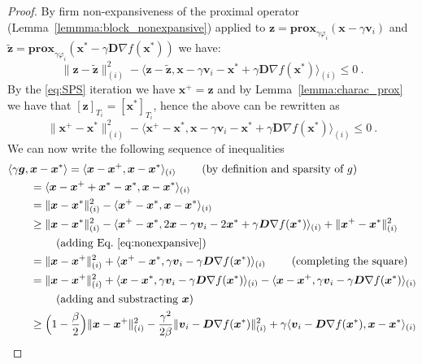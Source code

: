 \documentclass{article}
\def\prox{{\mathbf{prox}}}
\def\xx{{\boldsymbol x}}
\def\vv{{\boldsymbol v}}
\def\zz{{\boldsymbol z}}
\def\DD{{\boldsymbol D}}
\renewcommand{\llbracket}{[}
\renewcommand{\rrbracket}{]}
\begin{document}
\begin{proof}
By firm non-expansiveness of the proximal operator (Lemma~\ref{lemmma:block_nonexpansive}) applied to $\zz = \prox_{\gamma \varphi_i}(\xx - \gamma \vv_i)$ and $\tilde{\zz} = \prox_{\gamma \varphi_i}(\xx^* - \gamma \DD  \nabla f(\xx^*))$ we have:
\begin{equation}
  \|\zz - \tilde\zz\|_{(i)}^2 - \langle \zz - \tilde\zz, \xx - \gamma \vv_i - \xx^* + \gamma \DD \nabla f(\xx^*) \rangle_{(i)} \leq 0~.
\end{equation}
By the \eqref{eq:SPS} iteration we have $\xx^+ = \zz$ and by Lemma~\ref{lemma:charac_prox} we have that $\llbracket\zz\rrbracket_{T_i} = \llbracket\xx^*\rrbracket_{T_i}$, hence the above can be rewritten as
  \begin{equation}\label{eq:nonexpansive}
    \|\xx^+ - \xx^*\|_{(i)}^2 - \langle \xx^+ - \xx^*, \xx - \gamma \vv_i - \xx^* + \gamma \DD \nabla f(\xx^*) \rangle_{(i)} \leq 0~.
  \end{equation}
  We can now write the following sequence of inequalities
\begin{align}
    &\langle \gamma \boldsymbol g, \xx - \xx^*\rangle = \langle \xx - \xx^+, \xx - \xx^* \rangle_{(i)} \qquad \text{ (by definition and sparsity of $g$)}\nonumber\\
    &\qquad=  \langle \xx - \xx^+ + \xx^* - \xx^*, \xx - \xx^* \rangle_{(i)} \nonumber\\
    &\qquad= \|\xx - \xx^*\|_{(i)}^2 -  \langle \xx^+ - \xx^*, \xx - \xx^* \rangle_{(i)} \nonumber\\
    &\qquad\geq \|\xx - \xx^*\|_{(i)}^2 - \langle \xx^+ - \xx^*, 2 \xx - \gamma \vv_i- 2 \xx^* + \gamma \DD \nabla f(\xx^*) \rangle_{(i)} + \|\xx^+ - \xx^*\|^2_{(i)} \\
    &\qquad\qquad \text{ (adding Eq.~\eqref{eq:nonexpansive})} \nonumber\\
    &\qquad= \|\xx - \xx^+\|_{(i)}^2 + \langle \xx^+ - \xx^*, \gamma \vv_i -  \gamma \DD \nabla f(\xx^*) \rangle_{(i)} \qquad \text{ (completing the square)} \nonumber\\
    &\qquad= \|\xx - \xx^+\|_{(i)}^2 + \langle \xx - \xx^*, \gamma \vv_i -  \gamma \DD \nabla f(\xx^*) \rangle_{(i)}- \langle \xx - \xx^+, \gamma \vv_i-  \gamma \DD \nabla f(\xx^*) \rangle_{(i)}  \nonumber\\
    &\qquad\qquad \text{ (adding and substracting $\xx$)} \nonumber\\
    &\qquad\geq \Big(1 - \frac{\beta}{2}\Big)\|\xx - \xx^+\|_{(i)}^2 -  \frac{\gamma^2}{2\beta}\| \vv_i -  \DD \nabla f(\xx^*) \|_{(i)}^2 + \gamma\langle  \vv_i -  \DD \nabla f(\xx^*) , \xx - \xx^*\rangle_{(i)} \nonumber\\

\end{align}
\end{proof}
\end{document}
